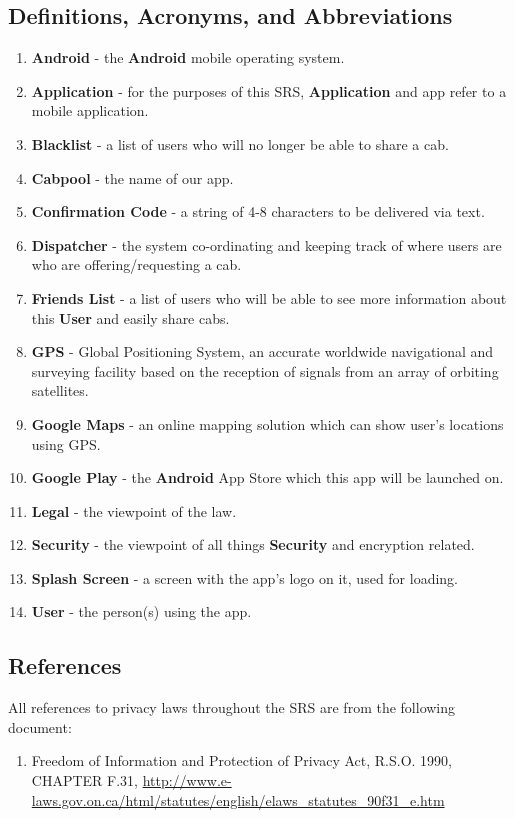 \documentclass[english]{article}
\begin{document}
\subsection{Definitions, Acronyms, and Abbreviations}
\label{sub:definitions_acronyms_and_abbreviations}
\begin{enumerate}
	\item  \textbf{Android} - the  \textbf{Android} mobile operating system.
	\item \textbf{Application} - for the purposes of this SRS, \textbf{Application} and app refer to a mobile application.
	\item \textbf{Blacklist} - a list of users who will no longer be able to share a cab.
	\item \textbf{Cabpool} - the name of our app.
	\item \textbf{Confirmation Code} - a string of 4-8 characters to be delivered via text.
	\item \textbf{Dispatcher} - the system co-ordinating and keeping track of where users are who are offering/requesting a cab.
	\item \textbf{Friends List} - a list of users who will be able to see more information about this \textbf{User} and easily share cabs.
	\item \textbf{GPS} - Global Positioning System, an accurate worldwide navigational and surveying facility based on the reception of signals from an array of orbiting satellites.
	\item \textbf{Google Maps} - an online mapping solution which can show user's locations using GPS.
	\item \textbf{Google Play} - the  \textbf{Android} App Store which this app will be launched on.
	\item \textbf{Legal} - the viewpoint of the law.
	\item \textbf{Security} - the viewpoint of all things \textbf{Security} and encryption related.
	\item \textbf{Splash Screen} - a screen with the app's logo on it, used for loading.
	\item \textbf{User} - the person(s) using the app.
\end{enumerate}

\subsection{References}
\label{sub:references}
All references to privacy laws throughout the SRS are from the following document:
\begin{enumerate}
	\item Freedom of Information and Protection of Privacy Act, R.S.O. 1990, CHAPTER F.31, \url{http://www.e-laws.gov.on.ca/html/statutes/english/elaws_statutes_90f31_e.htm}
\end{enumerate}
\end{document}
